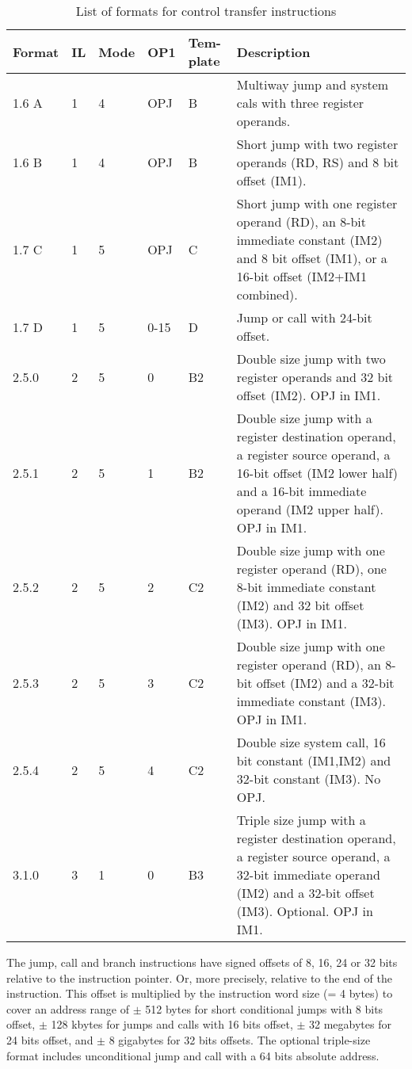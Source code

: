 \documentclass[forwardcom.tex]{subfiles}
\begin{document}
\begin{longtable}
{|p{10mm}|p{8mm}|p{8mm}|p{8mm}|p{8mm}|p{70mm}|}
\caption{List of formats for control transfer instructions}
\label{table:jumpInstructionFormats}
\endfirsthead
\endhead
\hline
Format & IL & Mode & OP1 & Tem-plate & Description \\
\hline
1.6 A & 1 & 4 & OPJ & B & Multiway jump and system cals with three register operands.  \\
\hline
1.6 B & 1 & 4 & OPJ & B & Short jump with two register operands (RD, RS) and 8 bit offset  (IM1).  \\
\hline
1.7 C & 1 & 5 & OPJ & C & Short jump with one register operand (RD), an 8-bit immediate constant (IM2) and 8 bit offset (IM1), or a 16-bit offset (IM2+IM1 combined). \\
\hline
1.7 D & 1 & 5 & 0-15 & D & Jump or call with 24-bit offset. \\
\hline
2.5.0 & 2 & 5 & 0 & B2 & Double size jump with two register operands and 32 bit offset (IM2). OPJ in IM1. \\
\hline
2.5.1 & 2 & 5 & 1 & B2 & Double size jump with a register destination operand, a register source operand, a 16-bit offset (IM2 lower half) and a 16-bit immediate operand (IM2 upper half). OPJ in IM1. \\
\hline
2.5.2 & 2 & 5 & 2 & C2 & Double size jump with one register operand (RD), one 8-bit immediate constant (IM2) and 32 bit offset (IM3). OPJ in IM1. \\
\hline
2.5.3 & 2 & 5 & 3 & C2 & Double size jump with one register operand (RD), an 8-bit offset (IM2) and a 32-bit immediate constant (IM3).  OPJ in IM1. \\
\hline
2.5.4 & 2 & 5 & 4 & C2 & Double size system call, 16 bit constant (IM1,IM2) and 32-bit constant (IM3). No OPJ. \\
\hline
3.1.0 & 3 & 1 & 0 & B3 & Triple size jump with a register destination operand, a register source operand, a 32-bit immediate operand (IM2) and a 32-bit offset (IM3). Optional. OPJ in IM1. \\
\hline
\end{longtable}

The jump, call and branch instructions have signed offsets of 8, 16, 24 or 32 bits relative to the instruction pointer. Or, more precisely, relative to the end of the instruction. This offset is multiplied by the instruction word size (= 4 bytes) to cover an address range of $\pm$ 512 bytes for short conditional jumps with 8 bits offset, $\pm$ 128 kbytes for jumps and calls with 16 bits offset, $\pm$ 32 megabytes for 24 bits offset, and $\pm$ 8 gigabytes for 32 bits offsets. The optional triple-size format includes unconditional jump and call with a 64 bits absolute address.
\vspace{2mm}
\end{document}
